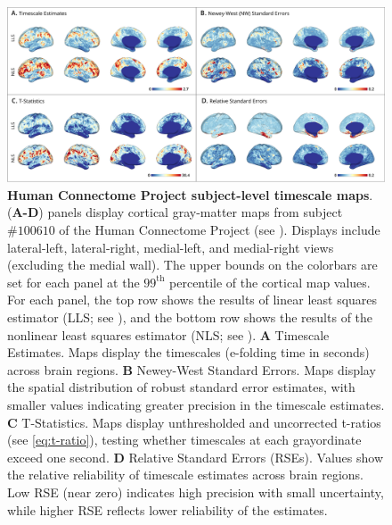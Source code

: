 \documentclass[latex/main.tex]{subfiles}
\begin{document}
\begin{figure}[H]
    \centering
    \includegraphics[width=1\textwidth]{latex/results/fig04-hcp1.png} 
    \caption{
    \textbf{Human Connectome Project subject-level timescale maps}.
    (\textbf{A-D}) panels display cortical gray-matter maps from subject $\# 100610$ of the Human Connectome Project (see ). Displays include lateral-left, lateral-right, medial-left, and medial-right views (excluding the medial wall). The upper bounds on the colorbars are set for each panel at the $99^\text{th}$ percentile of the cortical map values. For each panel, the top row shows the results of linear least squares estimator (LLS; see ), and the bottom row shows the results of the nonlinear least squares estimator (NLS; see ). 
    \textbf{A} Timescale Estimates. Maps display the timescales (e-folding time in seconds) across brain regions. 
    \textbf{B} Newey-West Standard Errors. Maps display the spatial distribution of robust standard error estimates, with smaller values indicating greater precision in the timescale estimates. 
    \textbf{C} T-Statistics. Maps display unthresholded and uncorrected t-ratios (see \eqref{eq:t-ratio}), testing whether timescales at each grayordinate exceed one second. 
    \textbf{D} Relative Standard Errors (RSEs). Values show the relative reliability of timescale estimates across brain regions. Low RSE (near zero) indicates high precision with small uncertainty, while higher RSE reflects lower reliability of the estimates.
    }
    \label{fig:map-hcp1}
\end{figure}
\end{document}
